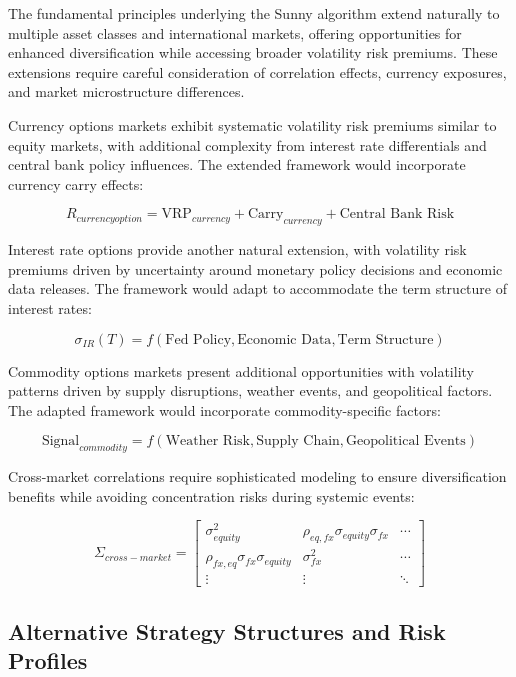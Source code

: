 \documentclass[
  american,
  11pt,
  11pt,
  letterpaper,
  onecolumn]{article}
\begin{document}
The fundamental principles underlying the Sunny algorithm extend
naturally to multiple asset classes and international markets, offering
opportunities for enhanced diversification while accessing broader
volatility risk premiums. These extensions require careful consideration
of correlation effects, currency exposures, and market microstructure
differences.

Currency options markets exhibit systematic volatility risk premiums
similar to equity markets, with additional complexity from interest rate
differentials and central bank policy influences. The extended framework
would incorporate currency carry effects:

\[R_{currency option} = \text{VRP}_{currency} + \text{Carry}_{currency} + \text{Central Bank Risk}\]

Interest rate options provide another natural extension, with volatility
risk premiums driven by uncertainty around monetary policy decisions and
economic data releases. The framework would adapt to accommodate the
term structure of interest rates:

\[\sigma_{IR}(T) = f(\text{Fed Policy}, \text{Economic Data}, \text{Term Structure})\]

Commodity options markets present additional opportunities with
volatility patterns driven by supply disruptions, weather events, and
geopolitical factors. The adapted framework would incorporate
commodity-specific factors:

\[\text{Signal}_{commodity} = f(\text{Weather Risk}, \text{Supply Chain}, \text{Geopolitical Events})\]

Cross-market correlations require sophisticated modeling to ensure
diversification benefits while avoiding concentration risks during
systemic events:

\[\Sigma_{cross-market} = \begin{bmatrix}
\sigma_{equity}^2 & \rho_{eq,fx}\sigma_{equity}\sigma_{fx} & \cdots \\
\rho_{fx,eq}\sigma_{fx}\sigma_{equity} & \sigma_{fx}^2 & \cdots \\
\vdots & \vdots & \ddots
\end{bmatrix}\]

\subsection{Alternative Strategy Structures and Risk
Profiles}\label{alternative-strategy-structures-and-risk-profiles}
\end{document}
